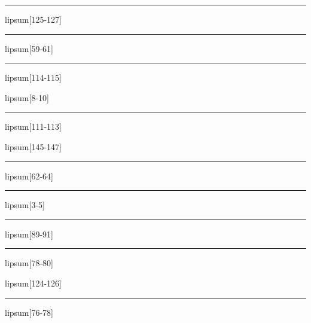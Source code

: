 \documentclass[11pt,a4paper]{article}
\begin{document}
\begin{simplewrap}
  \textcolor{brown!53}{\rule{5.6cm}{5.0cm}}
\end{simplewrap}
lipsum[125-127]

\begin{simplewrap}
  \textcolor{blue!49}{\rule{3.2cm}{7.0cm}}
\end{simplewrap}
lipsum[59-61]

\begin{simplewrap}
  \textcolor{olive!16}{\rule{5.3cm}{7.6cm}}
\end{simplewrap}
lipsum[114-115]

lipsum[8-10]

\begin{simplewrap}
  \textcolor{blue!30}{\rule{5.4cm}{4.3cm}}
\end{simplewrap}
lipsum[111-113]

lipsum[145-147]

\begin{simplewrap}
  \textcolor{cyan!20}{\rule{3.5cm}{6.9cm}}
\end{simplewrap}
lipsum[62-64]

\begin{simplewrap}
  \textcolor{purple!24}{\rule{4.4cm}{4.0cm}}
\end{simplewrap}
lipsum[3-5]

\begin{simplewrap}
  \textcolor{blue!28}{\rule{5.0cm}{3.3cm}}
\end{simplewrap}
lipsum[89-91]

\begin{simplewrap}
  \textcolor{violet!50}{\rule{5.9cm}{7.5cm}}
\end{simplewrap}
lipsum[78-80]

lipsum[124-126]

\begin{simplewrap}
  \textcolor{orange!25}{\rule{4.1cm}{4.9cm}}
\end{simplewrap}
lipsum[76-78]
\end{document}
